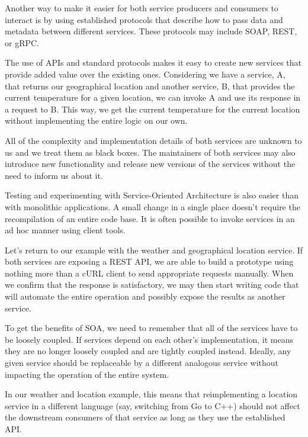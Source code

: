 Another way to make it easier for both service producers and consumers to interact is by using established protocols that describe how to pass data and metadata between different services. These protocols may include SOAP, REST, or gRPC.

The use of APIs and standard protocols makes it easy to create new services that provide added value over the existing ones. Considering we have a service, A, that returns our geographical location and another service, B, that provides the current temperature for a given location, we can invoke A and use its response in a request to B. This way, we get the current temperature for the current location without implementing the entire logic on our own.

All of the complexity and implementation details of both services are unknown to us and we treat them as black boxes. The maintainers of both services may also introduce new functionality and release new versions of the services without the need to inform us about it.

Testing and experimenting with Service-Oriented Architecture is also easier than with monolithic applications. A small change in a single place doesn't require the recompilation of an entire code base. It is often possible to invoke services in an ad hoc manner using client tools.

Let's return to our example with the weather and geographical location service. If both services are exposing a REST API, we are able to build a prototype using nothing more than a cURL client to send appropriate requests manually. When we confirm that the response is satisfactory, we may then start writing code that will automate the entire operation and possibly expose the results as another service.

\begin{tcolorbox}[colback=blue!5!white,colframe=blue!75!black, title=Note]
\hspace*{0.7cm}To get the benefits of SOA, we need to remember that all of the services have to be loosely coupled. If services depend on each other's implementation, it means they are no longer loosely coupled and are tightly coupled instead. Ideally, any given service should be replaceable by a different analogous service without impacting the operation of the entire system.
\end{tcolorbox}

In our weather and location example, this means that reimplementing a location service in a different language (say, switching from Go to C++) should not affect the downstream consumers of that service as long as they use the established API.

